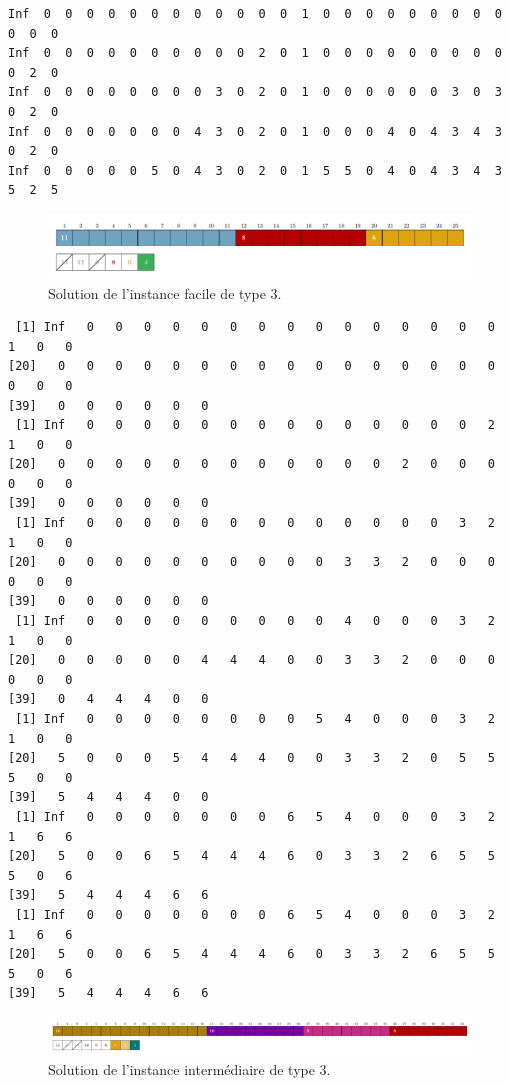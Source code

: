 \documentclass[11pt]{article}
\begin{document}
\begin{verbatim}
Inf  0  0  0  0  0  0  0  0  0  0  0  0  1  0  0  0  0  0  0  0  0  0  0  0  0
Inf  0  0  0  0  0  0  0  0  0  0  2  0  1  0  0  0  0  0  0  0  0  0  0  2  0
Inf  0  0  0  0  0  0  0  0  3  0  2  0  1  0  0  0  0  0  0  3  0  3  0  2  0
Inf  0  0  0  0  0  0  0  4  3  0  2  0  1  0  0  0  4  0  4  3  4  3  0  2  0
Inf  0  0  0  0  0  5  0  4  3  0  2  0  1  5  5  0  4  0  4  3  4  3  5  2  5
\end{verbatim}
\begin{figure}[htbp]
  \centering

    \includegraphics[width=0.6\linewidth]{ex3-6-DP.pdf}
    \caption{Solution de l'instance facile de type 3.}
  \end{figure}

\begin{verbatim}
 [1] Inf   0   0   0   0   0   0   0   0   0   0   0   0   0   0   0   1   0   0
[20]   0   0   0   0   0   0   0   0   0   0   0   0   0   0   0   0   0   0   0
[39]   0   0   0   0   0   0
 [1] Inf   0   0   0   0   0   0   0   0   0   0   0   0   0   0   2   1   0   0
[20]   0   0   0   0   0   0   0   0   0   0   0   0   2   0   0   0   0   0   0
[39]   0   0   0   0   0   0
 [1] Inf   0   0   0   0   0   0   0   0   0   0   0   0   0   3   2   1   0   0
[20]   0   0   0   0   0   0   0   0   0   0   3   3   2   0   0   0   0   0   0
[39]   0   0   0   0   0   0
 [1] Inf   0   0   0   0   0   0   0   0   0   4   0   0   0   3   2   1   0   0
[20]   0   0   0   0   0   4   4   4   0   0   3   3   2   0   0   0   0   0   0
[39]   0   4   4   4   0   0
 [1] Inf   0   0   0   0   0   0   0   0   5   4   0   0   0   3   2   1   0   0
[20]   5   0   0   0   5   4   4   4   0   0   3   3   2   0   5   5   5   0   0
[39]   5   4   4   4   0   0
 [1] Inf   0   0   0   0   0   0   0   6   5   4   0   0   0   3   2   1   6   6
[20]   5   0   0   6   5   4   4   4   6   0   3   3   2   6   5   5   5   0   6
[39]   5   4   4   4   6   6
 [1] Inf   0   0   0   0   0   0   0   6   5   4   0   0   0   3   2   1   6   6
[20]   5   0   0   6   5   4   4   4   6   0   3   3   2   6   5   5   5   0   6
[39]   5   4   4   4   6   6
\end{verbatim}
  \begin{figure}[htbp]
    \centering
    \includegraphics[width=0.6\linewidth]{ex3-9-DP.pdf}
    \caption{Solution de l'instance intermédiaire de type 3.}
  \end{figure}
\end{document}

